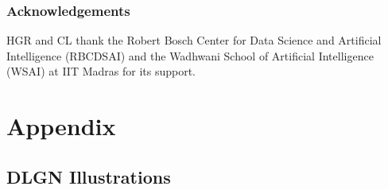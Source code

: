 \documentclass{article} %
\renewcommand{\>}{{\rightarrow}}
\renewcommand{\=}{\stackrel{\triangle}{=}}
\newcommand{\0}{{\mathbf 0}}
\begin{document}
\newpage




\subsubsection*{Acknowledgements}
HGR and CL thank the Robert Bosch Center for Data Science and Artificial Intelligence (RBCDSAI) and the Wadhwani School of Artificial Intelligence (WSAI) at IIT Madras for its support. 



\newpage 
\appendix
\section{Appendix}
\subsection{DLGN Illustrations}
\end{document}
